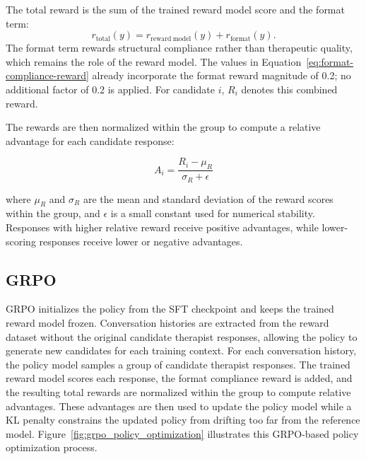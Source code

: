 The total reward is the sum of the trained reward model score and the format term:
\begin{equation}
r_{\mathrm{total}}(y)=r_{\mathrm{reward\ model}}(y)+r_{\mathrm{format}}(y).
\label{eq:total-policy-reward}
\end{equation}
The format term rewards structural compliance rather than therapeutic quality, which remains the role of the reward model. The values in Equation~\ref{eq:format-compliance-reward} already incorporate the format reward magnitude of 0.2; no additional factor of 0.2 is applied. For candidate \(i\), \(R_i\) denotes this combined reward.

The rewards are then normalized within the group to compute a relative advantage for each candidate response:

\[
A_i = \frac{R_i - \mu_R}{\sigma_R + \epsilon}
\]

where \(\mu_R\) and \(\sigma_R\) are the mean and standard deviation of the reward scores within the group, and \(\epsilon\) is a small constant used for numerical stability. Responses with higher relative reward receive positive advantages, while lower-scoring responses receive lower or negative advantages.

\subsection{GRPO}

GRPO initializes the policy from the SFT checkpoint and keeps the trained reward model frozen. Conversation histories are extracted from the reward dataset without the original candidate therapist responses, allowing the policy to generate new candidates for each training context. For each conversation history, the policy model samples a group of candidate therapist responses. The trained reward model scores each response, the format compliance reward is added, and the resulting total rewards are normalized within the group to compute relative advantages. These advantages are then used to update the policy model while a KL penalty constrains the updated policy from drifting too far from the reference model. Figure~\ref{fig:grpo_policy_optimization} illustrates this GRPO-based policy optimization process.

